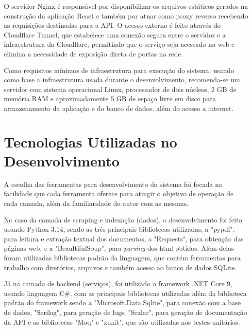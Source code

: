 O servidor Nginx é responsável por disponibilizar os arquivos estáticos gerados na construção da aplicação React e também por atuar como proxy reverso recebendo as requisições destinadas para a API. O acesso externo é feito através do Cloudflare Tunnel, que estabelece uma conexão segura entre o servidor e a infraestrutura da Cloudflare, permitindo que o serviço seja acessado na web e elimina a necessidade de exposição direta de portas na rede.

Como requisitos mínimos de infraestrutura para execução do sistema, usando como base a infraestrutura usada durante o desenvolvimento, recomenda-se um servidor com sistema operacional Linux, processador de dois núcleos, 2 GB de memória RAM e aproximadamente 5 GB de espaço livre em disco para armazenamento da aplicação e do banco de dados, além do acesso a internet.


\section{Tecnologias Utilizadas no Desenvolvimento}

A escolha das ferramentas para desenvolvimento do sistema foi focada na facilidade que cada ferramenta oferece para atingir o objetivo de operação de cada camada, além da familiaridade do autor com as mesmas. 

No caso da camada de scraping e indexação (dados), o desenvolvimento foi feito usando Python 3.14, sendo as três principais bibliotecas utilizadas, a "pypdf", para leitura e extração textual dos documentos, a "Requests", para obtenção das páginas web, e a "BeaultifulSoup", para \textit{parsing} dos html obtidos. Além delas foram utilizadas bibliotecas padrão da linguagem, que contém ferramentas para trabalho com diretórios, arquivos e também acesso ao banco de dados SQLite.

Já na camada de backend (serviços), foi utilizado o framework .NET Core 9, usando linguagem C\#, com as principais bibliotecas utilizadas além da biblioteca padrão do framework sendo a "Microsoft.Data.Sqlite", para conexão com a base de dados, "Serilog", para geração de logs, "Scalar", para geração de documentação da API e as bibliotecas "Moq" e "xunit", que são utilizadas nos testes unitários.

